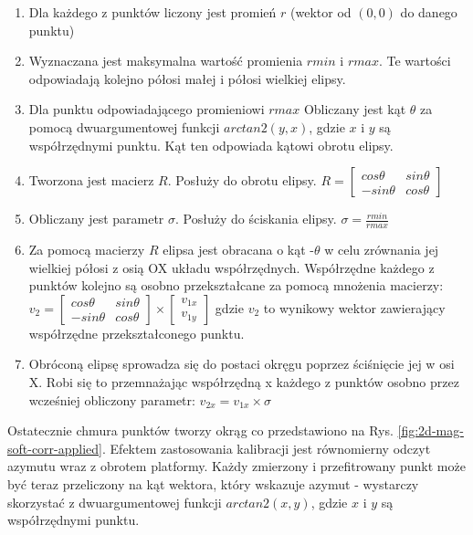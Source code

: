 \begin{enumerate}
    \item Dla każdego z punktów liczony jest promień $r$ (wektor od $(0,0)$ do danego punktu)
    \item Wyznaczana jest maksymalna wartość promienia $rmin$ i $rmax$. Te wartości odpowiadają kolejno półosi małej i półosi wielkiej elipsy.
    \item Dla punktu odpowiadającego promieniowi $rmax$ Obliczany jest kąt $\theta$ za pomocą dwuargumentowej funkcji $arctan2(y,x)$, gdzie $x$ i $y$ są współrzędnymi punktu. Kąt ten odpowiada kątowi obrotu elipsy.
    \item Tworzona jest macierz $R$. Posłuży do obrotu elipsy.
    $R = \begin{bmatrix}
            cos\theta & sin\theta\\
            -sin\theta & cos\theta
        \end{bmatrix}$
    \item Obliczany jest parametr $\sigma$. Posłuży do ściskania elipsy. $\sigma = \frac{rmin}{rmax}$
    \item Za pomocą macierzy $R$ elipsa jest obracana o kąt -$\theta$ w celu zrównania jej wielkiej półosi z osią OX układu współrzędnych. Współrzędne każdego z punktów kolejno są osobno przekształcane za pomocą mnożenia macierzy:
    $   
        \mathit{v}_{2}
        =
        \begin{bmatrix}
            cos\theta & sin\theta\\
            -sin\theta & cos\theta
        \end{bmatrix}
        \times
        \begin{bmatrix}
            \mathit{v}_{1x}\\
            \mathit{v}_{1y}
        \end{bmatrix}
    $
    gdzie $\mathit{v}_{2}$ to wynikowy wektor zawierający współrzędne przekształconego punktu.
    \item Obróconą elipsę sprowadza się do postaci okręgu poprzez ściśnięcie jej w osi X. Robi się to przemnażając współrzędną x każdego z punktów osobno przez wcześniej obliczony parametr: $\mathit{v}_{2x} = \mathit{v}_{1x} \times \sigma$
\end{enumerate}

Ostatecznie chmura punktów tworzy okrąg co przedstawiono na Rys. \ref{fig:2d-mag-soft-corr-applied}. Efektem zastosowania kalibracji jest równomierny odczyt azymutu wraz z obrotem platformy. Każdy zmierzony i przefitrowany punkt może być teraz przeliczony na kąt wektora, który wskazuje azymut - wystarczy skorzystać z dwuargumentowej funkcji $arctan2(x,y)$, gdzie $x$ i $y$ są współrzędnymi punktu.

